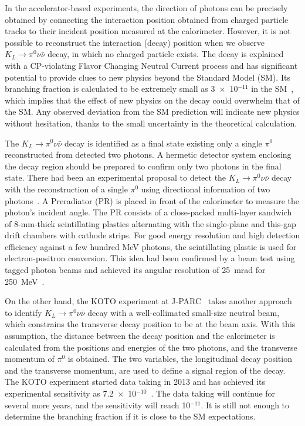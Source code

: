 \documentclass[12pt,times,draftclsnofoot,a4paper]{elsarticle}
\begin{document}
In the accelerator-based experiments, the direction of photons can be precisely obtained by connecting the interaction position obtained from charged particle tracks to their incident position measured at the calorimeter. However, it is not possible to reconstruct the interaction (decay) position when we observe $K_{L} \rightarrow \pi^{0}\nu\bar{\nu}$ decay, in which no charged particle exists. The decay is explained with a CP-violating Flavor Changing Neutral Current process and has significant potential to provide clues to new physics beyond the Standard Model (SM). Its branching fraction is calculated to be extremely small as 3~$\times$~10$^{-11}$ in the SM~\cite{KOTOtheory}, which implies that the effect of new physics on the decay could overwhelm that of the SM. Any observed deviation from the SM prediction will indicate new physics without hesitation, thanks to the small uncertainty in the theoretical calculation.

The $K_{L} \rightarrow \pi^{0}\nu\bar{\nu}$ decay is identified as a final state existing only a single $\pi^{0}$ reconstructed from detected two photons. A hermetic detector system enclosing the decay region should be prepared to confirm only two photons in the final state. There had been an experimental proposal to detect the $K_{L} \rightarrow \pi^{0}\nu\bar{\nu}$ decay with the reconstruction of a single $\pi^{0}$ using directional information of two photons~\cite{KOPIO}. A Preradiator (PR) is placed in front of the calorimeter to measure the photon's incident angle. The PR consists of a close-packed multi-layer sandwich of 8-mm-thick scintillating plastics alternating with the single-plane and this-gap drift chambers with cathode strips. For good energy resolution and high detection efficiency against a few hundred MeV photons, the scintillating plastic is used for electron-positron conversion. This idea had been confirmed by a beam test using tagged photon beams and achieved its angular resolution of 25~mrad for 250~MeV~\cite{KOPIOcdr}.

On the other hand, the KOTO experiment at J-PARC~\cite{KOTOexp} takes another approach to identify $K_{L} \rightarrow \pi^{0}\nu\bar{\nu}$ decay with a well-collimated small-size neutral beam, which constrains the transverse decay position to be at the beam axis. With this assumption, the distance between the decay position and the calorimeter is calculated from the positions and energies of the two photons, and the transverse momentum of $\pi^{0}$ is obtained. The two variables, the longitudinal decay position and the transverse momentum, are used to define a signal region of the decay. The KOTO experiment started data taking in 2013 and has achieved its experimental sensitivity as 7.2~$\times$~10$^{-10}$~\cite{KOTOexp}. The data taking will continue for  several more years, and the sensitivity will reach 10$^{-11}$. It is still not enough to determine the branching fraction if it is close to the SM expectations. 
\end{document}

